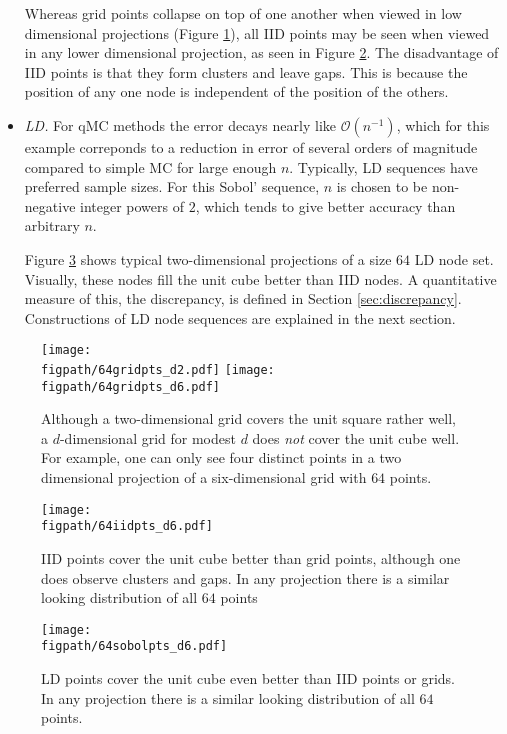 \documentclass{svproc}
\newcommand{\figpath}{Figures}
\begin{document}
\begin{itemize}
	Whereas grid points collapse on top of one another when viewed in low dimensional projections (Figure \ref{fig:grid}), all IID points may be seen when viewed in any lower dimensional projection, as seen in Figure \ref{fig:iid}.  The disadvantage of IID points is that they form clusters and leave gaps.  This is because the position of any one node is independent of the position of the others.

	\item \emph{LD.}  For qMC methods the error decays nearly like $\mathcal{O}(n^{-1})$, which for this example correponds to a reduction in error of several orders of magnitude compared to simple MC for large enough $n$.  Typically, LD sequences have preferred sample sizes.  For this Sobol' sequence, $n$ is chosen to be non-negative integer powers of $2$, which tends to give better accuracy than arbitrary $n$.

	Figure \ref{fig:ld} shows typical two-dimensional projections of a size $64$ LD node set.  Visually, these nodes fill the unit cube better than IID nodes.  A quantitative measure of this, the discrepancy, is defined in Section \ref{sec:discrepancy}.  Constructions of LD node sequences are explained in the next section.

\end{itemize}

\begin{figure}
	\centering
	\texttt{[image: \\figpath/64gridpts\_d2.pdf]}\qquad
	\texttt{[image: \\figpath/64gridpts\_d6.pdf]}
	\caption{Although a two-dimensional grid covers the unit square rather well, a $d$-dimensional grid for modest $d$ does \emph{not} cover the unit cube well.  For example, one can only see four distinct points in a two dimensional projection of a six-dimensional grid with $64$ points. \label{fig:grid}}
\end{figure}

\begin{figure}
	\centering
	\texttt{[image: \\figpath/64iidpts\_d6.pdf]}
	\caption{IID points cover the unit cube better than grid points, although one does observe clusters and gaps.  In any  projection there is  a similar looking distribution of all $64$ points \label{fig:iid}}
\end{figure}

\begin{figure}
	\centering
	\texttt{[image: \\figpath/64sobolpts\_d6.pdf]}
	\caption{LD points cover the unit cube even better than IID points or grids.  In any  projection there is  a similar looking distribution of all $64$ points. \label{fig:ld}}
\end{figure}
\end{document}
